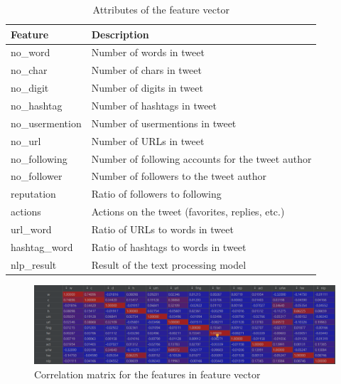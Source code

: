 \documentclass[conference]{IEEEtran}
\begin{document}
\begin{table}
\centering
\caption{Attributes of the feature vector}
\label{table:feature-vector}
\begin{tabular}{|l|l|} 
\hline
\rowcolor[rgb]{0.753,0.753,0.753} Feature         & Description                                        \\ 
\hline
\rowcolor[rgb]{0.753,0.753,0.753} no\_word        & Number of words in tweet                           \\ 
\hline
\rowcolor[rgb]{0.753,0.753,0.753} no\_char        & Number of chars in tweet                           \\ 
\hline
\rowcolor[rgb]{0.753,0.753,0.753} no\_digit       & Number of digits in tweet                          \\ 
\hline
\rowcolor[rgb]{0.753,0.753,0.753} no\_hashtag     & Number of hashtags in tweet                        \\ 
\hline
\rowcolor[rgb]{0.753,0.753,0.753} no\_usermention & Number of usermentions in tweet                    \\ 
\hline
\rowcolor[rgb]{0.753,0.753,0.753} no\_url         & Number of URLs in tweet                            \\ 
\hline
\rowcolor[rgb]{0.753,0.753,0.753} no\_following   & Number of following accounts for the tweet author  \\ 
\hline
\rowcolor[rgb]{0.753,0.753,0.753} no\_follower    & Number of followers to the tweet author            \\ 
\hline
\rowcolor[rgb]{0.753,0.753,0.753} reputation      & Ratio of followers to following                    \\ 
\hline
\rowcolor[rgb]{0.753,0.753,0.753} actions         & Actions on the tweet (favorites, replies, etc.)    \\ 
\hline
\rowcolor[rgb]{0.753,0.753,0.753} url\_word       & Ratio of URLs to words in tweet                    \\ 
\hline
\rowcolor[rgb]{0.753,0.753,0.753} hashtag\_word   & Ratio of hashtags to words in tweet                \\ 
\hline
\rowcolor[rgb]{0.753,0.753,0.753} nlp\_result     & Result of the text processing model                \\
\hline
\end{tabular}
\end{table}

\begin{figure}
    \centering
    \includegraphics[scale=0.3]{correlation-matrix.png}
    \caption{Correlation matrix for the features in feature vector}
    \label{fig:corr-matrix}
\end{figure}
\end{document}

